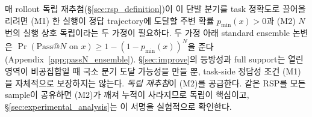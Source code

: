 매 rollout 독립 재추첨(\S\ref{sec:rsp_definition})이 이 단발 분기를 task 정확도로 끌어올리려면 (M1) 한 실행이 정답 trajectory에 도달할 주변 확률 $p_{\min}(x)>0$과 (M2) $N$번의 실행 상호 독립이라는 두 가정이 필요하다. 두 가정 아래 standard ensemble 논변은 $\Pr(\mathrm{Pass@}N \text{ on } x) \ge 1 - (1-p_{\min}(x))^N$을 준다(Appendix~\ref{app:passN_ensemble}). \S\ref{sec:improve}의 등방성과 full support는 열린 영역이 비공집합일 때 국소 분기 도달 가능성을 만들 뿐, task-side 정답성 조건 (M1)을 자체적으로 보장하지는 않는다. \emph{독립 재추첨}이 (M2)를 공급한다. 같은 RSP를 모든 sample이 공유하면 (M2)가 깨져 누적이 사라지므로 독립이 핵심이고, \S\ref{sec:experimental_analysis}는 이 서명을 실험적으로 확인한다.

